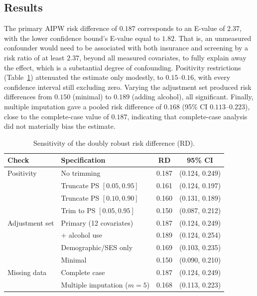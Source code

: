 \documentclass[12pt]{article}
\begin{document}
\subsection{Results} \label{subsec:ExtResults}

The primary AIPW risk difference of $0.187$ corresponds to an E-value of
$\mathbf{2.37}$, with the lower confidence bound's E-value equal to $1.82$. That
is, an unmeasured confounder would need to be associated with both insurance and
screening by a risk ratio of at least $2.37$, beyond all measured covariates,
to fully explain away the effect, which is a substantial degree of confounding. Positivity restrictions (Table~\ref{tab:sens}) attenuated the
estimate only modestly, to $0.15$--$0.16$, with every confidence interval still
excluding zero. Varying the adjustment set produced risk differences from
$0.150$ (minimal) to $0.189$ (adding alcohol), all significant. Finally,
multiple imputation gave a pooled risk difference of $0.168$ (95\% CI
$0.113$--$0.223$), close to the complete-case value of $0.187$, indicating that
complete-case analysis did not materially bias the estimate.

\begin{table}[h]
\centering
\caption{Sensitivity of the doubly robust risk difference (RD).}
\label{tab:sens}
\begin{tabular}{llcc}
\toprule
\textbf{Check} & \textbf{Specification} & \textbf{RD} & \textbf{95\% CI}\\
\midrule
Positivity      & No trimming               & 0.187 & (0.124, 0.249)\\
                & Truncate PS $[0.05,0.95]$ & 0.161 & (0.124, 0.197)\\
                & Truncate PS $[0.10,0.90]$ & 0.160 & (0.131, 0.189)\\
                & Trim to PS $[0.05,0.95]$  & 0.150 & (0.087, 0.212)\\
\midrule
Adjustment set  & Primary (12 covariates)   & 0.187 & (0.124, 0.249)\\
                & $+$ alcohol use           & 0.189 & (0.124, 0.254)\\
                & Demographic/SES only      & 0.169 & (0.103, 0.235)\\
                & Minimal                   & 0.150 & (0.090, 0.210)\\
\midrule
Missing data    & Complete case             & 0.187 & (0.124, 0.249)\\
                & Multiple imputation ($m=5$) & 0.168 & (0.113, 0.223)\\
\bottomrule
\end{tabular}
\end{table}
\end{document}
